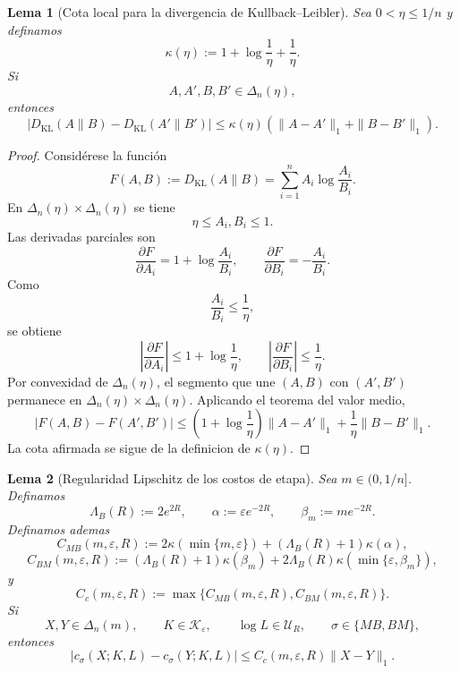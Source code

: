 \documentclass[12pt]{article}
\newtheorem{lema}{Lema}[section]
\begin{document}
\begin{lema}[Cota local para la divergencia de Kullback--Leibler]\label{lem:cota_local_KL}
Sea \(0<\eta\le 1/n\) y definamos
\[
\kappa(\eta)
:=
1+\log\frac1\eta+\frac1\eta.
\]
Si
\[
A,A',B,B'\in\Delta_n(\eta),
\]
entonces
\[
\left|
D_{\mathrm{KL}}(A\|B)
-
D_{\mathrm{KL}}(A'\|B')
\right|
\le
\kappa(\eta)
\left(
\|A-A'\|_1+\|B-B'\|_1
\right).
\]
\end{lema}

\begin{proof}
Considérese la función
\[
F(A,B):=D_{\mathrm{KL}}(A\|B)
=
\sum_{i=1}^n A_i\log\frac{A_i}{B_i}.
\]
En \(\Delta_n(\eta)\times\Delta_n(\eta)\) se tiene
\[
\eta\le A_i,B_i\le 1.
\]
Las derivadas parciales son
\[
\frac{\partial F}{\partial A_i}
=
1+\log\frac{A_i}{B_i},
\qquad
\frac{\partial F}{\partial B_i}
=
-\frac{A_i}{B_i}.
\]
Como
\[
\frac{A_i}{B_i}\le \frac1\eta,
\]
se obtiene
\[
\left|
\frac{\partial F}{\partial A_i}
\right|
\le
1+\log\frac1\eta,
\qquad
\left|
\frac{\partial F}{\partial B_i}
\right|
\le
\frac1\eta.
\]
Por convexidad de \(\Delta_n(\eta)\), el segmento que une \((A,B)\) con \((A',B')\) permanece en \(\Delta_n(\eta)\times\Delta_n(\eta)\). Aplicando el teorema del valor medio,
\[
|F(A,B)-F(A',B')|
\le
\left(1+\log\frac1\eta\right)\|A-A'\|_1
+
\frac1\eta\|B-B'\|_1.
\]
La cota afirmada se sigue de la definicion de \(\kappa(\eta)\).
\end{proof}

\begin{lema}[Regularidad Lipschitz de los costos de etapa]\label{lem:lipschitz_costos_etapa_ordenados}
Sea \(m\in(0,1/n]\). Definamos
\[
\Lambda_B(R):=2e^{2R},
\qquad
\alpha:=\varepsilon e^{-2R},
\qquad
\beta_m:=me^{-2R}.
\]
Definamos ademas
\[
C_{MB}(m,\varepsilon,R)
:=
2\kappa(\min\{m,\varepsilon\})
+
(\Lambda_B(R)+1)\kappa(\alpha),
\]
\[
C_{BM}(m,\varepsilon,R)
:=
(\Lambda_B(R)+1)\kappa(\beta_m)
+
2\Lambda_B(R)\kappa(\min\{\varepsilon,\beta_m\}),
\]
y
\[
C_c(m,\varepsilon,R)
:=
\max\{C_{MB}(m,\varepsilon,R),C_{BM}(m,\varepsilon,R)\}.
\]
Si
\[
X,Y\in\Delta_n(m),
\qquad
K\in\mathcal K_\varepsilon,
\qquad
\log L\in\mathcal U_R,
\qquad
\sigma\in\{MB,BM\},
\]
entonces
\[
|c_\sigma(X;K,L)-c_\sigma(Y;K,L)|
\le
C_c(m,\varepsilon,R)\|X-Y\|_1.
\]
\end{lema}
\end{document}
